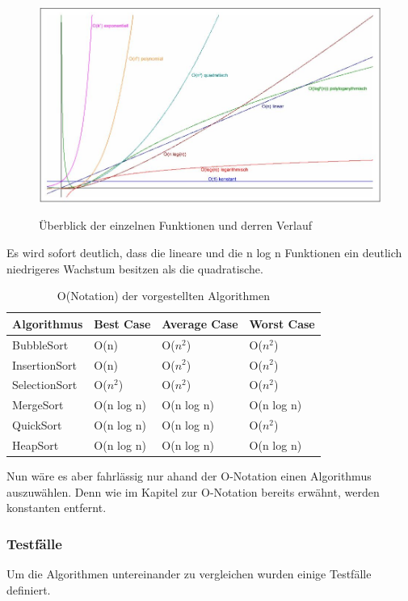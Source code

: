 \documentclass{article}
\begin{document}
\begin{figure} [h]
\centering
\includegraphics [width=\linewidth]{OWachstum.JPG} \label{fig:WachstumONotation}
\caption{Überblick der einzelnen Funktionen und derren Verlauf \cite{bild2006rehn}}
\end{figure}
Es wird sofort deutlich, dass die lineare und die n log n Funktionen ein deutlich niedrigeres Wachstum besitzen als die quadratische. 

\begin{table}[h]
\centering
\begin{tabular}{llll}
	\hline
	\textbf{Algorithmus} & \textbf{Best Case} & \textbf{Average Case} & \textbf{Worst Case} \\
	\hline
	BubbleSort & O(n) & O($n^{2}$) & O($n^{2}$) \\
InsertionSort & O(n) & O($n^{2}$) & O($n^{2}$) \\
SelectionSort & O($n^{2}$) & O($n^{2}$) & O($n^{2}$) \\
MergeSort & O(n log n) & O(n log n) & O(n log n) \\
QuickSort & O(n log n) & O(n log n) & O($n^{2}$) \\
HeapSort & O(n log n) & O(n log n) & O(n log n) \\
	\hline
\end{tabular}
\caption{O(Notation) der vorgestellten Algorithmen \cite{ONotationen}}
\label{tab:HeapSort}
\end{table}
Nun wäre es aber fahrlässig nur ahand der O-Notation einen Algorithmus auszuwählen. Denn wie im Kapitel zur O-Notation bereits erwähnt, werden konstanten entfernt.  

\subsubsection{Testfälle}
Um die Algorithmen untereinander zu vergleichen wurden einige Testfälle definiert.\\
\end{document}
